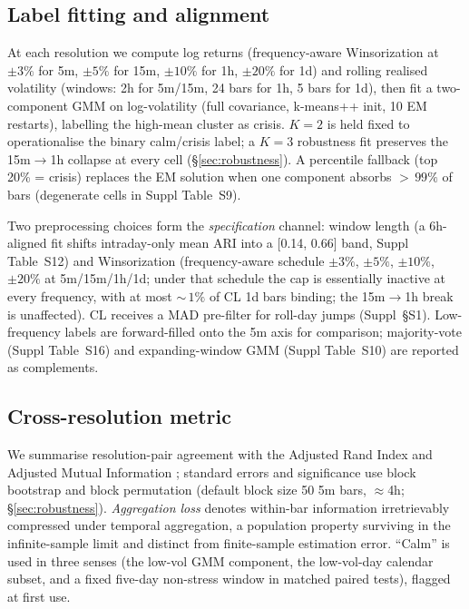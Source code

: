 \documentclass[preprint,12pt,authoryear]{elsarticle}
\begin{document}
\subsection{Label fitting and alignment}\label{sec:methods_fit}
At each resolution we compute log returns (frequency-aware Winsorization at $\pm 3\%$ for 5m, $\pm 5\%$ for 15m, $\pm 10\%$ for 1h, $\pm 20\%$ for 1d) and rolling realised volatility (windows: 2h for 5m/15m, 24 bars for 1h, 5 bars for 1d), then fit a two-component GMM on log-volatility (full covariance, k-means++ init, 10 EM restarts), labelling the high-mean cluster as crisis. $K{=}2$ is held fixed to operationalise the binary calm/crisis label; a $K{=}3$ robustness fit preserves the 15m$\to$1h collapse at every cell (\S\ref{sec:robustness}). A percentile fallback (top 20\% = crisis) replaces the EM solution when one component absorbs ${>}\,99\%$ of bars (degenerate cells in Suppl Table~S9).

Two preprocessing choices form the \emph{specification} channel: window length (a 6h-aligned fit shifts intraday-only mean ARI into a [0.14, 0.66] band, Suppl Table~S12) and Winsorization (frequency-aware schedule $\pm 3\%$, $\pm 5\%$, $\pm 10\%$, $\pm 20\%$ at 5m/15m/1h/1d; under that schedule the cap is essentially inactive at every frequency, with at most ${\sim}\,1\%$ of CL 1d bars binding; the 15m$\to$1h break is unaffected). CL receives a MAD pre-filter for roll-day jumps (Suppl~\S{}S1). Low-frequency labels are forward-filled onto the 5m axis for comparison; majority-vote (Suppl Table~S16) and expanding-window GMM (Suppl Table~S10) are reported as complements.

\subsection{Cross-resolution metric}\label{sec:methods_metric}
We summarise resolution-pair agreement with the Adjusted Rand Index \citep[ARI;][]{HubertArabie1985} and Adjusted Mutual Information \citep{Romano2016}; standard errors and significance use block bootstrap and block permutation (default block size 50 5m bars, $\approx$4h; \S\ref{sec:robustness}). \emph{Aggregation loss} denotes within-bar information irretrievably compressed under temporal aggregation, a population property surviving in the infinite-sample limit \citep{ChanZhangCheung2009} and distinct from finite-sample estimation error. ``Calm'' is used in three senses (the low-vol GMM component, the low-vol-day calendar subset, and a fixed five-day non-stress window in matched paired tests), flagged at first use.
\end{document}
